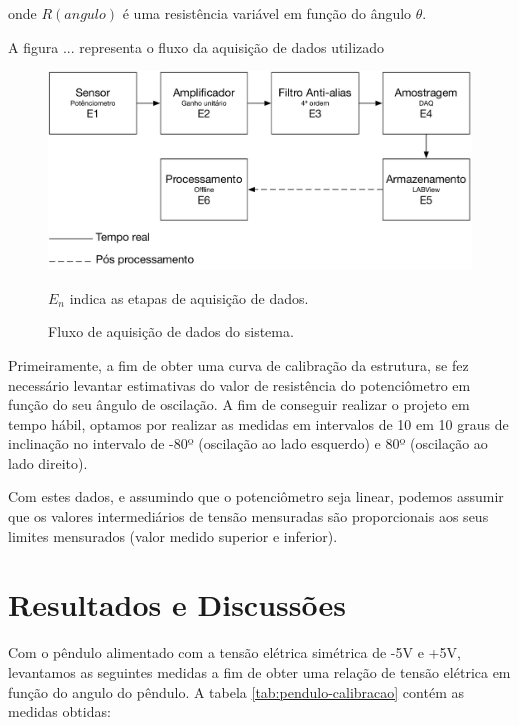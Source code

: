 \documentclass[12pt,a4paper]{instrumentacao}
\begin{document}
onde $R(angulo)$ é uma resistência variável em função do ângulo $\theta$.

A figura ... representa o fluxo da aquisição de dados utilizado

\begin{figure}[H]
\centering
\includegraphics[width=\textwidth]{Pendulo-Fluxograma.pdf}
\caption{Fluxo de aquisição de dados do sistema.}
$E_n$ indica as etapas de aquisição de dados.
\label{fig:pendulo}
\end{figure}


Primeiramente, a fim de obter uma curva de calibração da estrutura, se fez necessário levantar estimativas do valor de resistência  do potenciômetro em função do seu ângulo de oscilação. A fim de conseguir realizar o projeto em tempo hábil,  optamos por realizar as medidas em intervalos de 10 em 10 graus de inclinação no intervalo de -80º (oscilação ao lado esquerdo) e 80º (oscilação ao lado direito).

Com estes dados, e assumindo que o potenciômetro seja linear, podemos assumir que os valores intermediários de tensão mensuradas são proporcionais aos seus limites mensurados (valor medido superior e inferior).

\chapter{Resultados e Discussões}

Com o pêndulo alimentado com a tensão elétrica simétrica de -5V e +5V, levantamos as seguintes medidas a fim de obter uma relação de tensão elétrica em função do angulo do pêndulo. A tabela \ref{tab:pendulo-calibracao} contém as medidas obtidas:
\end{document}
